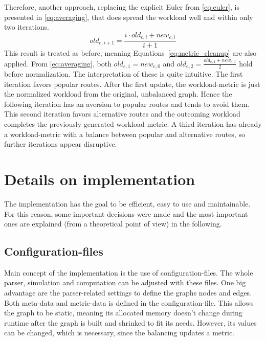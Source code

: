         Therefore, another approach, replacing the explicit Euler from \vref{eq:euler}, is presented in \vref{eq:averaging}, that does spread the workload well and within only two iterations.
        \begin{equation}
        \label{eq:averaging}
            \mathit{old}_{e,i+1} = \frac{i \cdot \mathit{old}_{e,i} + \mathit{new}_{e,i}}{i+1}
        \end{equation}
        This result is treated as before, meaning Equations~\ref{eq:metric_cleanup} are also applied.
        From \vref{eq:averaging}, both $\mathit{old}_{e,1}=\mathit{new}_{e,0}$ and $\mathit{old}_{e,2}=\frac{\mathit{old}_{e,1} + \mathit{new}_{e,1}}{2}$ hold before normalization.
        The interpretation of these is quite intuitive.
        The first iteration favors popular routes.
        After the first update, the workload-metric is just the normalized workload from the original, unbalanced graph.
        Hence the following iteration has an aversion to popular routes and tends to avoid them.
        This second iteration favors alternative routes and the outcoming workload completes the previously generated workload-metric.
        A third iteration has already a workload-metric with a balance between popular and alternative routes, so further iterations appear disruptive.

\section{Details on implementation}
\label{chap:balancing:implementation}

    The implementation has the goal to be efficient, easy to use and maintainable.
    For this reason, some important decisions were made and the most important ones are explained (from a theoretical point of view) in the following.

    \subsection{Configuration-files}

        Main concept of the implementation is the use of configuration-files.
        The whole parser, simulation and computation can be adjusted with these files.
        One big advantage are the parser-related settings to define the graphs nodes and edges.
        Both meta-data and metric-data is defined in the configuration-file.
        This allows the graph to be static, meaning its allocated memory doesn't change during runtime after the graph is built and shrinked to fit its needs.
        However, its values can be changed, which is necessary, since the balancing updates a metric.

